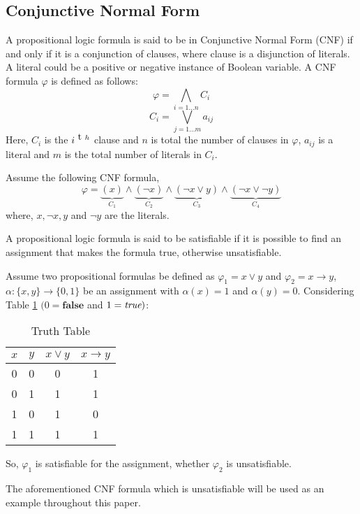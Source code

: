 \subsection{Conjunctive Normal Form}
A propositional logic formula is said to be in Conjunctive Normal Form (CNF) if and only if it is a conjunction of clauses, where clause is a disjunction of literals. A literal could be a positive or negative instance of Boolean variable. A CNF formula $\varphi$ is defined as follows:
$$\varphi = \bigwedge\limits_{i=1\ldots n} C_{i}$$
$$ C_{i} = \bigvee\limits_{j=1\ldots m} a_{ij}$$
Here, $C_{i}$ is the $i^{\text th}$ clause and $n$ is total the number of clauses in $\varphi$, $a_{ij}$ is a literal and $m$ is the total number of literals in $C_{i}$.\newline
\begin{example}
	Assume the following CNF formula,
	$$\varphi=\underbrace{(x)}\limits_{C_{1}}\wedge\underbrace{(\neg x)}\limits_{C_2}\wedge\underbrace{(\neg x\vee y)}\limits_{C_{3}}\wedge\underbrace{(\neg x \vee \neg y)}\limits_{C_{4}}$$
	where, $x, \neg x, y$ and $\neg y$ are the literals.
\end{example}
A propositional logic formula is said to be satisfiable if it is possible to find an assignment that makes the formula true, otherwise unsatisfiable.
\begin{example}
	Assume two propositional formulas be defined as $\varphi_{1}=x\vee y$ and $\varphi_{2}=x\rightarrow y$, $\alpha : \{x, y\}\rightarrow \{0, 1\}$ be an assignment with $\alpha (x)=1$ and $\alpha (y)=0$. Considering Table \ref{truth-table} $(0=\mathbf{false}$ and $1=\emph{true})$:
	\begin{table}[]
		\centering
		\caption{Truth Table}
		\label{truth-table}
		\begin{tabular}{|c|c|c|c|}
			\hline
			$x$ & $y$ & $x \vee y$ & $x\rightarrow y$ \\ \hline
			0   & 0   & 0          & 1                \\ \hline
			0   & 1   & 1          & 1                \\ \hline
			1   & 0   & 1          & 0                \\ \hline
			1   & 1   & 1          & 1                \\ \hline
		\end{tabular}
	\end{table}
	So, $\varphi_{1}$ is satisfiable for the assignment, whether $\varphi_{2}$ is unsatisfiable.
\end{example}
The aforementioned CNF formula which is unsatisfiable will be used as an example throughout this paper.
